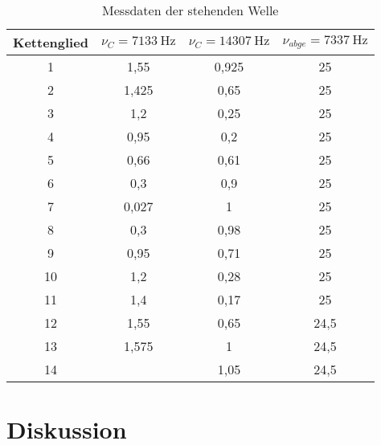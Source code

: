 \FloatBarrier
{}
\begin{table}
 \centering
 \begin{tabular}[width=\textwidth]{S[table-format=1.0] S S S[table-format=2.0]}
     \toprule
      {Kettenglied} & {$\nu_C=\SI{7133}{\hertz}$} & {$\nu_{C} = \SI{14307}{\hertz}$} & {$\nu_{abge}=\SI{7337}{\hertz}$}\\
      & 1,55 & 0,925 & 25 \\
      2 & 1,425 & 0,65 & 25 \\
      3 & 1,2 & 0,25 & 25 \\
      4 & 0,95 & 0,2 & 25 \\
      5 & 0,66 & 0,61 & 25 \\
      6 & 0,3 & 0,9  & 25 \\
      7 & 0,027 & 1  & 25 \\
      8 & 0,3 & 0,98 & 25  \\
      9 & 0,95& 0,71  & 25 \\
      10 & 1,2 & 0,28 & 25 \\
      11 & 1,4 & 0,17 & 25 \\
      12 & 1,55 & 0,65 & 24,5 \\
      13 & 1,575 & 1 & 24,5 \\
    14 & \text{\,\,\,\,\,\,\,\,\,\,\,\,--} & 1,05 & 24,5 \\
      \bottomrule
\end{tabular}
  \caption{Messdaten der stehenden Welle}
  \label{tab:stehendeWelle}
\end{table}

\section{Diskussion}

